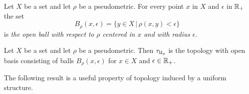 \begin{definition}
Let $X$ be a set and let $\rho$ be a pseudometric. For every point $x$ in $X$ and $\epsilon$ in ${\mathbb R}_+$ the set
$$B_{\rho}(x,\epsilon) = \big\{y\in X\,\big|\,\rho(x,y) < \epsilon\big\}$$
is \textit{the open ball with respect to $\rho$ centered in $x$ and with radius $\epsilon$}.
\end{definition}

\begin{remark}\label{remark:topology_induced_by_pseudometric_open_balls_basis}
Let $X$ be a set and let $\rho$ be a pseudometric. Then $\tau_{{\mathfrak U}_{\rho}}$ is the topology with open basis consisting of balls $B_{\rho}(x,\epsilon)$ for $x\in X$ and $\epsilon \in {\mathbb R}_+$.
\end{remark}
\noindent
The following result is a useful property of topology induced by a uniform structure. 

